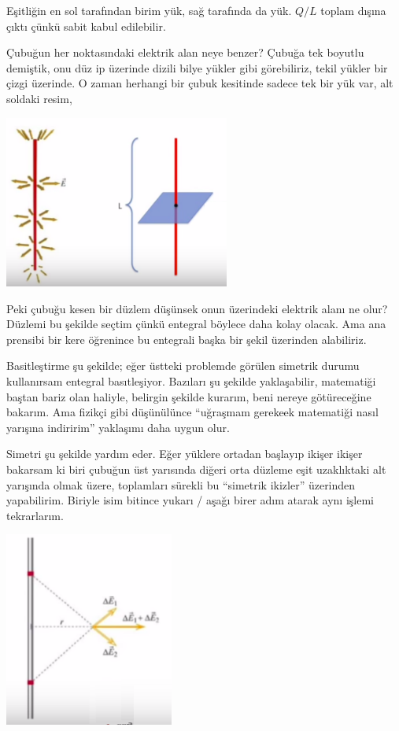 \documentclass[12pt,fleqn]{article}\usepackage{../../common}
\begin{document}
Eşitliğin en sol tarafından birim yük, sağ tarafında da yük. $Q/L$ toplam
dışına çıktı çünkü sabit kabul edilebilir.

Çubuğun her noktasındaki elektrik alan neye benzer? Çubuğa tek boyutlu
demiştik, onu düz ip üzerinde dizili bilye yükler gibi görebiliriz, tekil
yükler bir çizgi üzerinde. O zaman herhangi bir çubuk kesitinde sadece tek
bir yük var, alt soldaki resim, 

\includegraphics[width=20em]{05_03.png}

Peki çubuğu kesen bir düzlem düşünsek onun üzerindeki elektrik alanı ne
olur? Düzlemi bu şekilde seçtim çünkü entegral böylece daha kolay
olacak. Ama ana prensibi bir kere öğrenince bu entegrali başka bir şekil
üzerinden alabiliriz. 

Basitleştirme şu şekilde; eğer üstteki problemde görülen simetrik durumu
kullanırsam entegral basıtleşiyor. Bazıları şu şekilde yaklaşabilir,
matematiği baştan bariz olan haliyle, belirgin şekilde kurarım, beni nereye
götüreceğine bakarım. Ama fizikçi gibi düşünülünce ``uğraşmam gerekeek
matematiği nasıl yarışına indiririm'' yaklaşımı daha uygun olur. 

Simetri şu şekilde yardım eder. Eğer yüklere ortadan başlayıp ikişer ikişer
bakarsam ki biri çubuğun üst yarısında diğeri orta düzleme eşit uzaklıktaki
alt yarışında olmak üzere, toplamları sürekli bu ``simetrik ikizler''
üzerinden yapabilirim. Biriyle isim bitince yukarı / aşağı birer adım
atarak aynı işlemi tekrarlarım.

\includegraphics[width=15em]{05_04.png}
\end{document}
